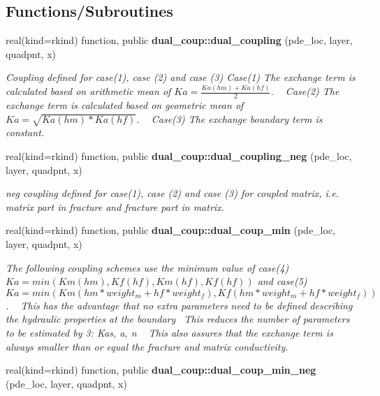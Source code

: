 \subsection*{Functions/\+Subroutines}
\begin{DoxyCompactItemize}
\item 
real(kind=rkind) function, public {\bf dual\+\_\+coup\+::dual\+\_\+coupling} (pde\+\_\+loc, layer, quadpnt, x)
\begin{DoxyCompactList}\small\item\em Coupling defined for case(1), case (2) and case (3) Case(1) The exchange term is calculated based on arithmetic mean of $Ka=\frac{Ka(hm)+Ka(hf)}{2}$. ~\newline
 Case(2) The exchange term is calculated based on geometric mean of $Ka=\sqrt{Ka(hm)*Ka(hf)}$. ~\newline
 Case(3) The exchange boundary term is constant.~\newline
 \end{DoxyCompactList}\item 
real(kind=rkind) function, public {\bf dual\+\_\+coup\+::dual\+\_\+coupling\+\_\+neg} (pde\+\_\+loc, layer, quadpnt, x)
\begin{DoxyCompactList}\small\item\em neg coupling defined for case(1), case (2) and case (3) for coupled matrix, i.\+e. matrix part in fracture and fracture part in matrix. \end{DoxyCompactList}\item 
real(kind=rkind) function, public {\bf dual\+\_\+coup\+::dual\+\_\+coup\+\_\+min} (pde\+\_\+loc, layer, quadpnt, x)
\begin{DoxyCompactList}\small\item\em The following coupling schemes use the minimum value of case(4) $Ka=min(Km(hm),Kf(hf),Km(hf),Kf(hf))$ and case(5) $Ka=min(Km(hm*weight_m+hf*weight_f),Kf(hm*weight_m+hf*weight_f))$. ~\newline
 This has the advantage that no extra parameters need to be defined describing the hydraulic properties at the boundary~\newline
 This reduces the number of parameters to be estimated by 3\+: Kas, a, n ~\newline
 This also assures that the exchange term is always smaller than or equal the fracture and matrix conductivity. \end{DoxyCompactList}\item 
real(kind=rkind) function, public {\bf dual\+\_\+coup\+::dual\+\_\+coup\+\_\+min\+\_\+neg} (pde\+\_\+loc, layer, quadpnt, x)

\end{DoxyCompactItemize}
